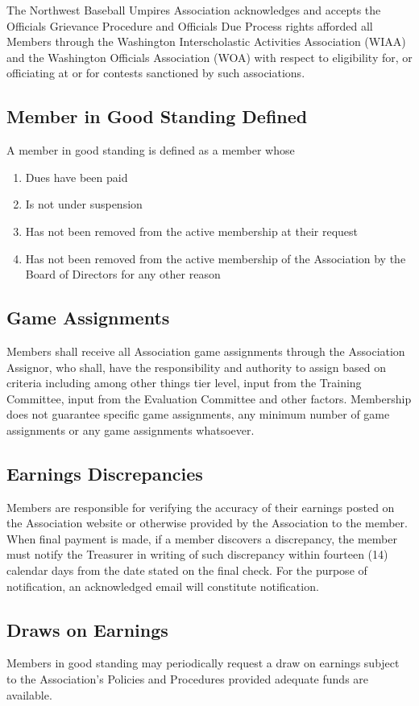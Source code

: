 \documentclass[letterpaper,11pt]{article}
\begin{document}
The Northwest Baseball Umpires Association acknowledges and accepts the Officials Grievance Procedure and Officials Due Process rights afforded all Members through the Washington Interscholastic Activities Association (WIAA) and the Washington Officials Association (WOA) with respect to eligibility for, or officiating at or for contests sanctioned by such associations.

\subsection{Member in Good Standing Defined}
A member in good standing is defined as a member whose
\begin{enumerate}
\item Dues have been paid
\item Is not under suspension
\item Has not been removed from the active membership at their request
\item Has not been removed from the active membership of the Association by the Board of Directors for any other reason
\end{enumerate}
\subsection{Game Assignments}
Members shall receive all Association game assignments through the Association Assignor, who shall, have the responsibility and authority to assign based on criteria including among other things tier level, input from the Training Committee, input from the Evaluation Committee and other factors. Membership does not guarantee specific game assignments, any minimum number of game assignments or any game assignments whatsoever.
\subsection{Earnings Discrepancies}
Members are responsible for verifying the accuracy of their earnings posted on the Association website or otherwise provided by the Association to the member. When final payment is made, if a member discovers a discrepancy, the member must notify the Treasurer in writing of such discrepancy within fourteen (14) calendar days from the date stated on the final check. For the purpose of notification, an acknowledged email will constitute notification.
\subsection{Draws on Earnings}
Members in good standing may periodically request a draw on earnings subject to the Association’s Policies and Procedures provided adequate funds are available.
\end{document}
